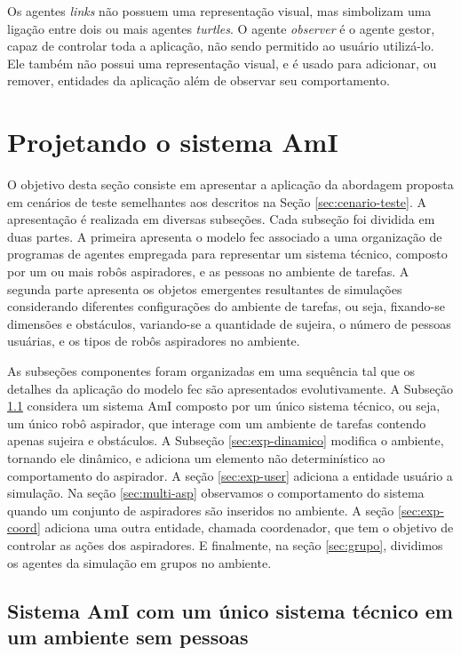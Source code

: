 Os agentes \textit{links} não possuem uma representação visual, mas simbolizam uma ligação entre dois ou mais agentes \textit{turtles}. O agente \textit{observer} é o agente gestor, capaz de controlar toda a aplicação, não sendo permitido ao usuário utilizá-lo. Ele também não possui uma representação visual, e é usado para adicionar, ou remover, entidades da aplicação além de observar seu comportamento. 

\section{Projetando o sistema AmI}
\label{sec:dev-experimento}

O objetivo desta seção consiste em apresentar a aplicação da abordagem proposta em cenários de teste semelhantes aos descritos na Seção \ref{sec:cenario-teste}. A apresentação é realizada em diversas subseções. Cada subseção foi dividida em duas partes. A primeira apresenta o modelo \acrshort{fec} associado a uma organização de programas de agentes empregada para representar um sistema técnico, composto por um ou mais robôs aspiradores, e as pessoas no ambiente de tarefas. A segunda parte apresenta os objetos emergentes resultantes de simulações considerando diferentes configurações do ambiente de tarefas, ou seja, fixando-se dimensões e obstáculos, variando-se a quantidade de sujeira, o número de pessoas usuárias, e os tipos de robôs aspiradores no ambiente.

As subseções componentes foram organizadas em uma sequência tal que os detalhes da aplicação do modelo \acrshort{fec} são apresentados evolutivamente. A Subseção \ref{subsec:exp1} considera um sistema AmI composto por um único sistema técnico, ou seja, um único robô aspirador, que interage com um ambiente de tarefas contendo apenas sujeira e obstáculos. A Subseção \ref{sec:exp-dinamico} modifica o ambiente, tornando ele dinâmico, e adiciona um elemento não determinístico ao comportamento do aspirador. A seção \ref{sec:exp-user} adiciona a entidade usuário a simulação. Na seção \ref{sec:multi-asp} observamos o comportamento do sistema quando um conjunto de aspiradores são inseridos no ambiente. A seção \ref{sec:exp-coord} adiciona uma outra entidade, chamada coordenador, que tem o objetivo de controlar as ações dos aspiradores. E finalmente, na seção \ref{sec:grupo}, dividimos os agentes da simulação em grupos no ambiente.

\subsection{Sistema AmI com um único sistema técnico em um ambiente sem pessoas}
\label{subsec:exp1}

